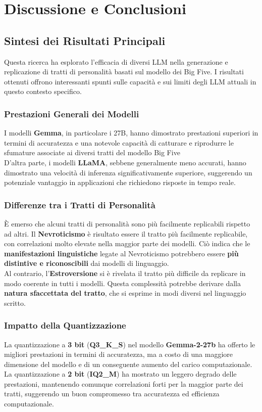 \section{Discussione e Conclusioni}

\subsection{Sintesi dei Risultati Principali}
Questa ricerca ha esplorato l'efficacia di diversi LLM nella generazione e replicazione di tratti di personalità basati sul modello dei Big Five.
I risultati ottenuti offrono interessanti spunti sulle capacità e sui limiti degli LLM attuali in questo contesto specifico.

\subsubsection{Prestazioni Generali dei Modelli}
I modelli \textbf{Gemma}, in particolare i 27B, hanno dimostrato prestazioni superiori in termini di accuratezza e una notevole capacità di catturare e riprodurre le sfumature associate ai diversi tratti del modello Big Five\\ 
D'altra parte, i modelli \textbf{LLaMA}, sebbene generalmente meno accurati, hanno dimostrato una velocità di inferenza significativamente superiore, suggerendo un potenziale vantaggio in applicazioni che richiedono risposte in tempo reale.

\subsubsection{Differenze tra i Tratti di Personalità}

È emerso che alcuni tratti di personalità sono più facilmente replicabili rispetto ad altri.
Il \textbf{Nevroticismo} è risultato essere il tratto più facilmente replicabile, con correlazioni molto elevate nella maggior parte dei modelli.
Ciò indica che le \textbf{manifestazioni linguistiche} legate al Nevroticismo potrebbero essere \textbf{più distintive e riconoscibili} dai modelli di linguaggio.\\
Al contrario, l'\textbf{Estroversione} si è rivelata il tratto più difficile da replicare in modo coerente in tutti i modelli. Questa complessità potrebbe derivare dalla \textbf{natura sfaccettata del tratto}, che si esprime in modi diversi nel linguaggio scritto.

\subsubsection{Impatto della Quantizzazione}
La quantizzazione a \textbf{3 bit} (\textbf{Q3\_K\_S}) nel modello \textbf{Gemma-2-27b} ha offerto le migliori prestazioni in termini di accuratezza, ma a costo di una maggiore dimensione del modello e di un conseguente aumento del carico computazionale.\\ La quantizzazione a \textbf{2 bit} (\textbf{IQ2\_M}) ha mostrato un leggero degrado delle prestazioni, mantenendo comunque correlazioni forti per la maggior parte dei tratti, suggerendo un buon compromesso tra accuratezza ed efficienza computazionale.
